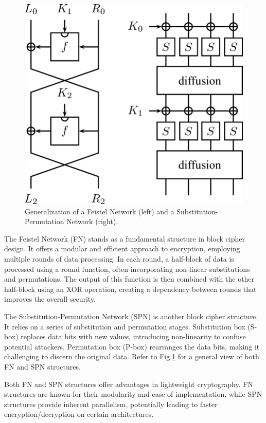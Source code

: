 \documentclass[conference]{IEEEtran}
\begin{document}
\begin{figure}
    \centering
    \includegraphics[width=\columnwidth]{figures/FEISTEL-SPN.png}
    \caption{Generalization of a Feistel Network (left) and a Substitution-Permutation Network (right).}
    \label{fig:FEISTEL-SPN}
\end{figure}

The Feistel Network (FN) stands as a fundamental structure in block cipher design. It offers a modular and efficient approach to encryption, employing multiple rounds of data processing. In each round, a half-block of data is processed using a round function, often incorporating non-linear substitutions and permutations. The output of this function is then combined with the other half-block using an XOR operation, creating a dependency between rounds that improves the overall security\cite{FEISTEL}.

The Substitution-Permutation Network (SPN) is another block cipher structure. It relies on a series of substitution and permutation stages. Substitution box (S-box) replaces data bits with new values, introducing non-linearity to confuse potential attackers. Permutation box (P-box) rearranges the data bits, making it challenging to discern the original data\cite{heys1996substitution}. Refer to Fig.\ref{fig:FEISTEL-SPN} for a general view of both FN and SPN structures.

Both FN and SPN structures offer advantages in lightweight cryptography. FN structures are known for their modularity and ease of implementation, while SPN structures provide inherent parallelism, potentially leading to faster encryption/decryption on certain architectures.
\end{document}
